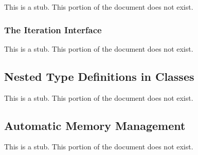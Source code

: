 This is a stub.  This portion of the document does not exist.

\subsubsection{The Iteration Interface}
\label{The_Iteration_Interface}

This is a stub.  This portion of the document does not exist.

\subsection{Nested Type Definitions in Classes}
\label{Nested_Type_Definitions_in_Classes}

This is a stub.  This portion of the document does not exist.

\subsection{Automatic Memory Management}
\label{Automatic_Memory_Management}

This is a stub.  This portion of the document does not exist.
